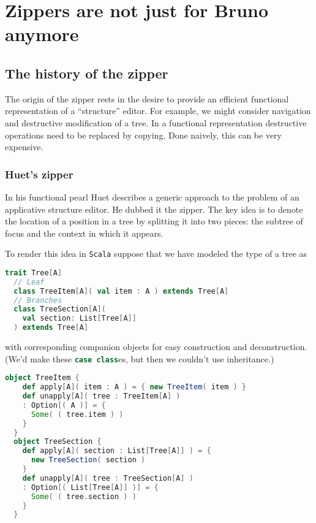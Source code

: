\section{Zippers are not just for Bruno anymore}

\subsection{The history of the zipper}

The origin of the zipper rests in the desire to provide an efficient
functional representation of a ``structure'' editor. For example, we
might consider navigation and destructive modification of a tree. In a
functional representation destructive operations need to be replaced
by copying. Done naively, this can be very expensive.

\subsubsection{Huet's zipper}

In his functional pearl Huet describes a generic approach to the
problem of an applicative structure editor. He dubbed it the
zipper. The key idea is to denote the location of a position in a tree
by splitting it into two pieces: the subtree of focus and the context
in which it appears.

To render this idea in \texttt{Scala} suppose that we have modeled the
type of a tree as

\begin{lstlisting}[language=Scala,mathescape=true]
  trait Tree[A]
  // Leaf
  class TreeItem[A]( val item : A ) extends Tree[A]
  // Branches
  class TreeSection[A](
    val section: List[Tree[A]]
  ) extends Tree[A]  
\end{lstlisting}

with corresponding companion objects for easy construction and
deconstruction. (We'd make these
\lstinline[language=Scala,mathescape=true]!case class!es, but then we
couldn't use inheritance.)

\begin{lstlisting}[language=Scala,mathescape=true]
  object TreeItem {
    def apply[A]( item : A ) = { new TreeItem( item ) }
    def unapply[A]( tree : TreeItem[A] )
    : Option[( A )] = {
      Some( ( tree.item ) )
    }
  }
  object TreeSection {
    def apply[A]( section : List[Tree[A]] ) = {
      new TreeSection( section )
    }
    def unapply[A]( tree : TreeSection[A] )
    : Option[( List[Tree[A]] )] = {
      Some( ( tree.section ) )
    }
  }
\end{lstlisting}

